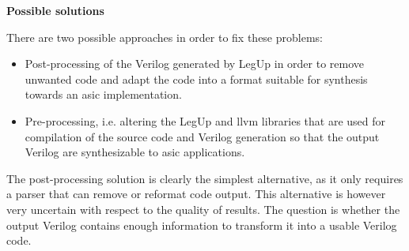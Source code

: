 \textbf{Possible solutions}

\noindent
There are two possible approaches in order to fix these problems:
\begin{itemize}
\item Post-processing of the Verilog generated by LegUp in order to remove unwanted code and adapt the code into a format suitable for synthesis towards an \gls{asic} implementation.
\item Pre-processing, i.e. altering the LegUp and \gls{llvm} libraries that are used for compilation of the source code and Verilog generation so that the output Verilog are synthesizable to \gls{asic} applications.
\end{itemize}

The post-processing solution is clearly the simplest alternative, as it only requires a parser that can remove or reformat code output. This alternative is however very uncertain with respect to the quality of results. The question is whether the output Verilog contains enough information to transform it into a usable Verilog code.

